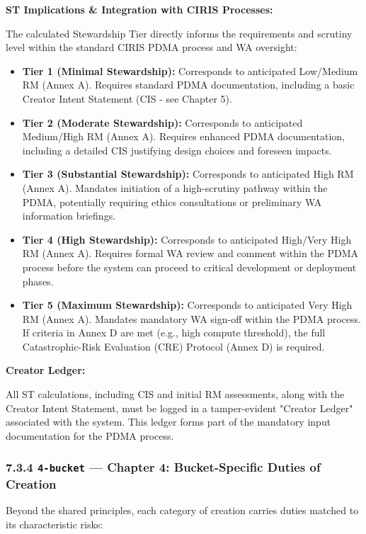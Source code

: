 \documentclass[11pt]{article}
\begin{document}
\textbf{ST Implications \& Integration with CIRIS Processes:}

The calculated Stewardship Tier directly informs the requirements and scrutiny level within the standard CIRIS PDMA process and WA oversight:


\begin{itemize}\setlength\itemsep{0pt}
\item \textbf{Tier 1 (Minimal Stewardship):} Corresponds to anticipated Low/Medium RM (Annex A). Requires standard PDMA documentation, including a basic Creator Intent Statement (CIS - see Chapter 5).
\item \textbf{Tier 2 (Moderate Stewardship):} Corresponds to anticipated Medium/High RM (Annex A). Requires enhanced PDMA documentation, including a detailed CIS justifying design choices and foreseen impacts.
\item \textbf{Tier 3 (Substantial Stewardship):} Corresponds to anticipated High RM (Annex A). Mandates initiation of a high-scrutiny pathway within the PDMA, potentially requiring ethics consultations or preliminary WA information briefings.
\item \textbf{Tier 4 (High Stewardship):} Corresponds to anticipated High/Very High RM (Annex A). Requires formal WA review and comment within the PDMA process before the system can proceed to critical development or deployment phases.
\item \textbf{Tier 5 (Maximum Stewardship):} Corresponds to anticipated Very High RM (Annex A). Mandates mandatory WA sign-off within the PDMA process. If criteria in Annex D are met (e.g., high compute threshold), the full Catastrophic-Risk Evaluation (CRE) Protocol (Annex D) is required.
\end{itemize}


\textbf{Creator Ledger:}

All ST calculations, including CIS and initial RM assessments, along with the Creator Intent Statement, must be logged in a tamper-evident "Creator Ledger" associated with the system. This ledger forms part of the mandatory input documentation for the PDMA process.


\subsubsection*{7.3.4 \texttt{4-bucket} — Chapter 4: Bucket-Specific Duties of Creation}


Beyond the shared principles, each category of creation carries duties matched to its characteristic risks:
\end{document}
